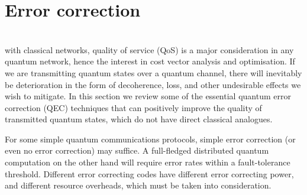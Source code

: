%
%

\section{Error correction}\label{sec:QOS_chap}

\\

 with classical networks, quality of service (QoS) is a major consideration in any quantum network, hence the interest in cost vector analysis and optimisation. If we are transmitting quantum states over a quantum channel, there will inevitably be deterioration in the form of decoherence, loss, and other undesirable effects we wish to mitigate. In this section we review some of the essential quantum error correction (QEC) techniques that can positively improve the quality of transmitted quantum states, which do not have direct classical analogues.

For some simple quantum communications protocols, simple error correction (or even no error correction) may suffice. A full-fledged distributed quantum computation on the other hand will require error rates within a fault-tolerance threshold. Different error correcting codes have different error correcting power, and different resource overheads, which must be taken into consideration.

%
%

